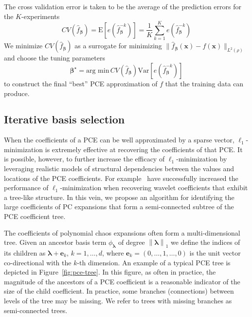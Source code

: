 The cross validation error is taken to be the average of the prediction errors for the $K$-experiments
\[
CV(\hat{f}_{\boldsymbol{\beta}}) = \mathrm{E}[e(\hat{f}_{\boldsymbol{\beta}}^{-k})] = \frac{1}{K}\sum_{k=1}^K e(\hat{f}_{\boldsymbol{\beta}}^{-k})
\]
We minimize $CV(\hat{f}_{\boldsymbol{\beta}})$ as a surrogate for minimizing
$\| \hat{f}_{\boldsymbol{\beta}}(\mathbf{x})-f(\mathbf{x})\|_{L^2(\rho)}$ and choose the tuning parameters 
\begin{equation}
\label{eq:optimal_tuning-parameters}
\boldsymbol{\beta}^\star = \text{arg min}\, CV(\hat{f}_{\boldsymbol{\beta}})\mathrm{Var}[e(\hat{f}_{\boldsymbol{\beta}}^{-k})]
\end{equation}
to construct the final ``best'' PCE approximation of $f$ that the training data can produce. 
\subsection{Iterative basis selection}
\label{sec:iterative-basis-selection}
When the coefficients of a PCE can be well approximated by a sparse vector, $\ell_1$-minimization is extremely effective at recovering the coefficients of that PCE. 
It is possible, however, to further increase the efficacy of $\ell_1$-minimization by leveraging realistic models of structural dependencies between the values and 
locations of the PCE coefficients. For example~\cite{Baraniuk_CDH_IEEIT_2010,Duarte_WB_SPARS_2005,La_D_IEEEIP_2006} have successfully increased the performance
of $\ell_1$-minimization when recovering wavelet coefficients that exhibit a tree-like structure. In this vein, we propose an algorithm for identifying the large coefficients
of PC expansions that form a semi-connected subtree of the PCE coefficient tree.

The coefficients of polynomial chaos expansions often form a multi-dimensional tree.
Given an ancestor basis term $\phi_{\boldsymbol{\lambda}}$ of degree $\left\lVert \boldsymbol{\lambda} \right\rVert_{1}$ we define the indices of its children as $\boldsymbol{\lambda}+\mathbf{e}_k$, $k=1,\ldots,d$,
where $\mathbf{e}_k=(0,\ldots,1,\ldots,0)$ is the unit vector co-directional with the $k$-th dimension.
An example of a typical PCE tree is depicted in Figure~\ref{fig:pce-tree}. In this figure, as often in practice, the magnitude of the ancestors of a PCE coefficient is a
reasonable indicator of the size of the child coefficient. In practice, some branches (connections) between levels of the tree may be missing. We refer to trees with missing branches 
as semi-connected trees.

